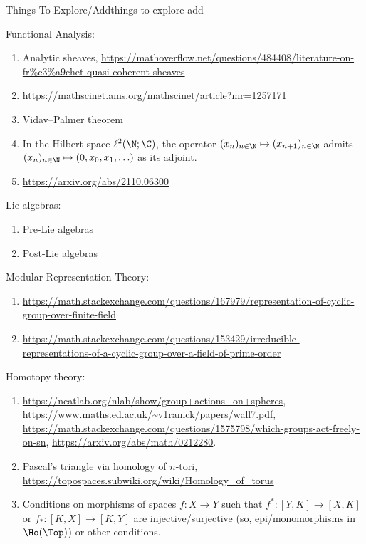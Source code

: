 \begin{remark}{Things To Explore/Add}{things-to-explore-add}
\begin{enumerate}
\begin{enumerate}
\begin{enumerate}
                    \end{enumerate}
            \end{enumerate}
    \end{enumerate}
    Functional Analysis:
    \begin{enumerate}
        \item Analytic sheaves, \url{https://mathoverflow.net/questions/484408/literature-on-fr\%c3\%a9chet-quasi-coherent-sheaves}
        \item \url{https://mathscinet.ams.org/mathscinet/article?mr=1257171}
        \item Vidav--Palmer theorem
        \item In the Hilbert space $\ell^{2}(\N;\C)$, the operator $(x_{n})_{n\in\N}\mapsto(x_{n+1})_{n\in\N}$ admits $(x_{n})_{n\in\N}\mapsto(0,x_{0},x_{1},\ldots)$ as its adjoint.
        \item \url{https://arxiv.org/abs/2110.06300}
    \end{enumerate}
    Lie algebras:
    \begin{enumerate}
        \item Pre-Lie algebras
        \item Post-Lie algebras
    \end{enumerate}
    Modular Representation Theory:
    \begin{enumerate}
        \item \url{https://math.stackexchange.com/questions/167979/representation-of-cyclic-group-over-finite-field}
        \item \url{https://math.stackexchange.com/questions/153429/irreducible-representations-of-a-cyclic-group-over-a-field-of-prime-order}
    \end{enumerate}
    Homotopy theory:
    \begin{enumerate}
        \item \url{https://ncatlab.org/nlab/show/group+actions+on+spheres}, \url{https://www.maths.ed.ac.uk/~v1ranick/papers/wall7.pdf}, \url{https://math.stackexchange.com/questions/1575798/which-groups-act-freely-on-sn}, \url{https://arxiv.org/abs/math/0212280}.
        \item Pascal's triangle via homology of $n$-tori, \url{https://topospaces.subwiki.org/wiki/Homology_of_torus}
        \item Conditions on morphisms of spaces $f\colon X\to Y$ such that $f^{*}\colon[Y,K]\to[X,K]$ or $f_{*}\colon[K,X]\to[K,Y]$ are injective/surjective (so, epi/monomorphisms in $\Ho(\Top)$) or other conditions.

\end{enumerate}
\end{remark}
